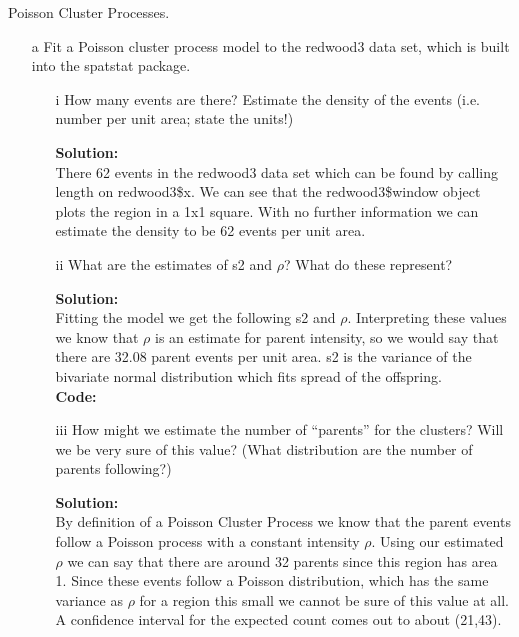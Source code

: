 \documentclass[12pt]{article}
\makeatletter
\theoremstyle{homework}
\newenvironment{exercise}[1]
{\def\@currentlabel{#1}\exercisecore}
{\endexercisecore}
\newcommand{\localhead}[1]{\par\smallskip\noindent\textbf{#1}\nobreak\\}%
\newcommand\solution{\localhead{Solution:}}
\makeatother
\begin{document}
\begin{exercise}{8} Poisson Cluster Processes. 
  \begin{enumerate}
    \item[a] Fit a Poisson cluster process model to the redwood3 data set, which is
    built into the spatstat package.\\
    \begin{enumerate}
      \item[i] How many events are there? Estimate the density of the events (i.e.
      number per unit area; state the units!)\\
      \solution There 62 events in the redwood3 data set which can be found by calling length on redwood3\$x. We can see that the redwood3\$window
      object plots the region in a 1x1 square. With no further information we can estimate the density to be 62 events per unit area. 
      \vspace{.15in}


      \item[ii] What are the estimates of s2 and $\rho$? What do these represent?\\ 
      \solution Fitting the model we get the following s2 and $\rho$. Interpreting these values we know that $\rho$ is an estimate for parent intensity, 
      so we would say that there are 32.08 parent events per unit area. s2 is the variance of the bivariate normal distribution which fits spread of the offspring.\\
      
      \textbf{Code:}
      \begin{center}
      
      \end{center}
      \vspace{.15in}


      \item[iii] How might we estimate the number of “parents” for the clusters? Will
      we be very sure of this value? (What distribution are the number of
      parents following?)\\
      \solution By definition of a Poisson Cluster Process we know that the parent events follow a Poisson process with a constant intensity $\rho$. Using our estimated $\rho$ we 
      can say that there are around 32 parents since this region has area 1. Since these events follow a Poisson distribution, which has the same variance as $\rho$ for a region this small we cannot be sure of this value at all. 
      A confidence interval for the expected count comes out to about (21,43).
      \vspace{.15in}


\end{enumerate}
\end{enumerate}
\end{exercise}
\end{document}
